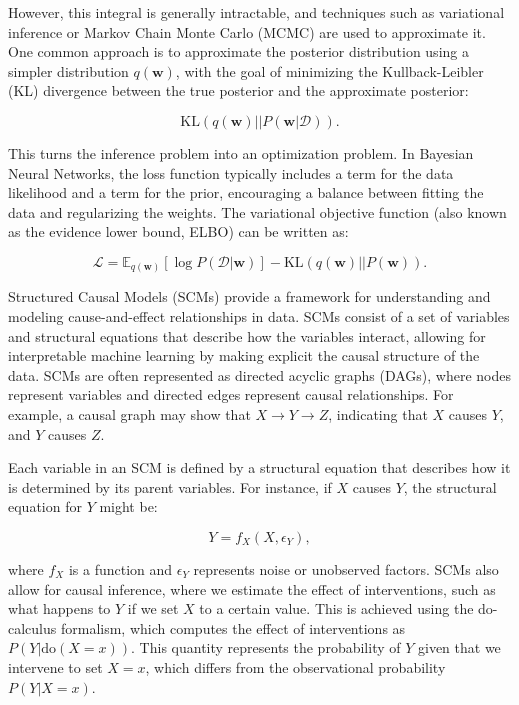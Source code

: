 \documentclass{article}
\begin{document}
However, this integral is generally intractable, and techniques such as variational inference or Markov Chain Monte Carlo (MCMC) are used to approximate it. One common approach is to approximate the posterior distribution using a simpler distribution $q(\mathbf{w})$, with the goal of minimizing the Kullback-Leibler (KL) divergence between the true posterior and the approximate posterior:

\[
\text{KL}(q(\mathbf{w}) || P(\mathbf{w} | \mathcal{D})).
\]

This turns the inference problem into an optimization problem. In Bayesian Neural Networks, the loss function typically includes a term for the data likelihood and a term for the prior, encouraging a balance between fitting the data and regularizing the weights. The variational objective function (also known as the evidence lower bound, ELBO) can be written as:

\[
\mathcal{L} = \mathbb{E}_{q(\mathbf{w})} \left[ \log P(\mathcal{D} | \mathbf{w}) \right] - \text{KL}(q(\mathbf{w}) || P(\mathbf{w})).
\]

Structured Causal Models (SCMs) provide a framework for understanding and modeling cause-and-effect relationships in data. SCMs consist of a set of variables and structural equations that describe how the variables interact, allowing for interpretable machine learning by making explicit the causal structure of the data. SCMs are often represented as directed acyclic graphs (DAGs), where nodes represent variables and directed edges represent causal relationships. For example, a causal graph may show that $X \rightarrow Y \rightarrow Z$, indicating that $X$ causes $Y$, and $Y$ causes $Z$.

Each variable in an SCM is defined by a structural equation that describes how it is determined by its parent variables. For instance, if $X$ causes $Y$, the structural equation for $Y$ might be:

\[
Y = f_X(X, \epsilon_Y),
\]

where $f_X$ is a function and $\epsilon_Y$ represents noise or unobserved factors. SCMs also allow for causal inference, where we estimate the effect of interventions, such as what happens to $Y$ if we set $X$ to a certain value. This is achieved using the do-calculus formalism, which computes the effect of interventions as $P(Y | \text{do}(X = x))$. This quantity represents the probability of $Y$ given that we intervene to set $X = x$, which differs from the observational probability $P(Y | X = x)$.
\end{document}

